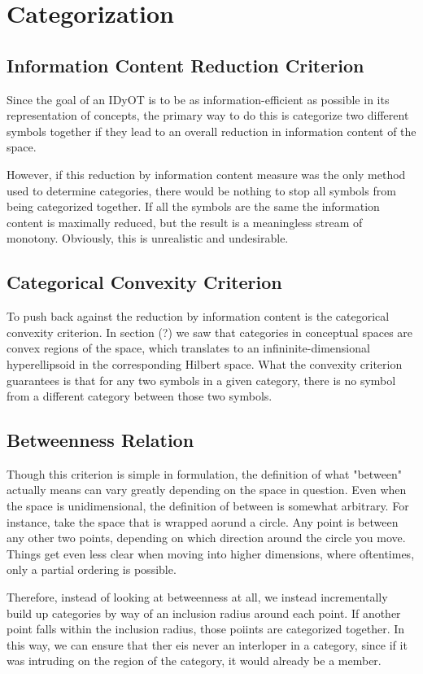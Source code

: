 \section{Categorization}

\subsection{Information Content Reduction Criterion} 
Since the goal of an IDyOT is to be as information-efficient as possible in its representation of concepts, the primary way to do this is categorize two different symbols together if they lead to an overall reduction in information content of the space.

However, if this reduction by information content measure was the only method used to determine categories, there would be nothing to stop all symbols from being categorized together.  If all the symbols are the same the information content is maximally reduced, but the result is a meaningless stream of monotony.  Obviously, this is unrealistic and undesirable.

\subsection{Categorical Convexity Criterion}
To push back against the reduction by information content is the categorical convexity criterion.  In section (?) we saw that categories in conceptual spaces are convex regions of the space, which translates to an infininite-dimensional hyperellipsoid in the corresponding Hilbert space.  What the convexity criterion guarantees is that for any two symbols in a given category, there is no symbol from a different category between those two symbols.

\subsection{Betweenness Relation}
Though this criterion is simple in formulation, the definition of what "between" actually means can vary greatly depending on the space in question.  Even when the space is unidimensional, the definition of between is somewhat arbitrary.  For instance, take the space that is wrapped aorund a circle.  Any point is between any other two points, depending on which direction around the circle you move.  Things get even less clear when moving into higher dimensions, where oftentimes, only a partial ordering is possible.

Therefore, instead of looking at betweenness at all, we instead incrementally build up categories by way of an inclusion radius around each point.  If another point falls within the inclusion radius, those poiints are categorized together.  In this way, we can ensure that ther eis never an interloper in a category, since if it was intruding on the region of the category, it would already be a member.

